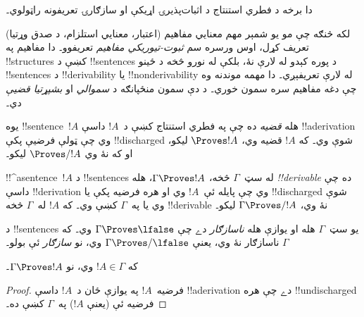 \documentclass[../../../include/open-logic-section]{subfiles}
\begin{document}
      {}
      {}


\begin{editorial}
دا برخه د فطري استنتاج د اثبات‌پذيرۍ اړيکې او سازګارۍ تعريفونه
راټولوي۔
\end{editorial}

\begin{explain}
لکه څنګه چې مو يو شمېر مهم معنايي مفاهيم (اعتبار، معنايي استلزام،
د صدق وړتيا) تعريف کړل، اوس ورسره سم \emph{ثبوت-تيوريکي مفاهيم}
تعريفوو۔ دا مفاهيم په !!{structure}s کښې د !!{sentence}s د پوره
کېدو له لارې نۀ، بلکې له نورو څخه د ځينو !!{sentence}s د
!!{derivability} يا !!{nonderivability} له لارې تعريفېږي۔ دا مهمه
موندنه وه چې دغه مفاهيم سره سمون خوري۔ د دې سمون منځپانګه د
\emph{سموالي} او \emph{بشپړتيا قضيې} دي۔
\end{explain}


\begin{defn}[قضيې]
يوه !!{sentence}~$!A$ هله \emph{قضيه} ده چې په فطري استنتاج کښې
د~$!A$ داسې !!a{derivation} وي چې ټولې فرضيې پکې !!{discharged}
شوې وي۔ که $!A$ قضيه وي، $\Proves !A$ ليکو، او که نۀ وي
$\Proves/ !A$ ليکو۔
\end{defn}

\begin{defn}[!!^{derivability}]
!!^a{sentence}~$!A$ د !!{sentence}s له سټ~$\Gamma$ څخه،
$\Gamma \Proves !A$، هله \emph{!!{derivable}} ده چې داسې
!!{derivation} وي چې پايله ئې~$!A$ وي او هره فرضيه پکې يا
!!{discharged} شوې وي يا په~$\Gamma$ کښې وي۔ که $!A$ له~$\Gamma$
څخه !!{derivable} نۀ وي، $\Gamma \Proves/ !A$ ليکو۔
\end{defn}

\begin{defn}[سازګاري]
د !!{sentence}s يو سټ~$\Gamma$ هله او يوازې هله \emph{ناسازګار}
دے چې $\Gamma \Proves \lfalse$ وي۔ که $\Gamma$ ناسازګار نۀ وي،
يعنې $\Gamma \Proves/ \lfalse$ وي، نو \emph{سازګار} ئې بولو۔
\end{defn}

\begin{prop}[انعکاسيت]
که $!A \in \Gamma$ وي، نو $\Gamma \Proves !A$۔
\end{prop}

\begin{proof}
فرضيه~$!A$ په يوازې ځان د~$!A$ داسې !!a{derivation} دے چې هره
!!{undischarged} فرضيه ئې (يعنې $!A$) په~$\Gamma$ کښې ده۔
\end{proof}
  
\end{document}
